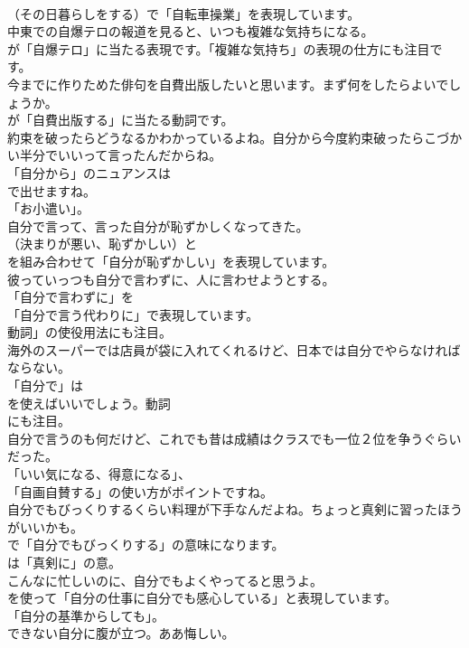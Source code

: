 \documentclass[8pt]{extreport}
\begin{document}
\begin{CJK}{UTF8}{min}
\\	（その日暮らしをする）で「自転車操業」を表現しています。	
\\	中東での自爆テロの報道を見ると、いつも複雑な気持ちになる。 
\\	が「自爆テロ」に当たる表現です。「複雑な気持ち」の表現の仕方にも注目です。	
\\	今までに作りためた俳句を自費出版したいと思います。まず何をしたらよいでしょうか。 
\\	が「自費出版する」に当たる動詞です。	
\\	約束を破ったらどうなるかわかっているよね。自分から今度約束破ったらこづかい半分でいいって言ったんだからね。 
\\	「自分から」のニュアンスは
\\	で出せますね。
\\	「お小遣い」。	
\\	自分で言って、言った自分が恥ずかしくなってきた。 
\\	（決まりが悪い、恥ずかしい）と 
\\	を組み合わせて「自分が恥ずかしい」を表現しています。	
\\	彼っていっつも自分で言わずに、人に言わせようとする。 
\\	「自分で言わずに」を
\\	「自分で言う代わりに」で表現しています。
\\	動詞」の使役用法にも注目。	
\\	海外のスーパーでは店員が袋に入れてくれるけど、日本では自分でやらなければならない。 
\\	「自分で」は
\\	を使えばいいでしょう。動詞
\\	にも注目。	
\\	自分で言うのも何だけど、これでも昔は成績はクラスでも一位２位を争うぐらいだった。 
\\	「いい気になる、得意になる」、
\\	「自画自賛する」の使い方がポイントですね。	
\\	自分でもびっくりするくらい料理が下手なんだよね。ちょっと真剣に習ったほうがいいかも。 
\\	で「自分でもびっくりする」の意味になります。
\\	は「真剣に」の意。	
\\	こんなに忙しいのに、自分でもよくやってると思うよ。 
\\	を使って「自分の仕事に自分でも感心している」と表現しています。
\\	「自分の基準からしても」。	
\\	できない自分に腹が立つ。ああ悔しい。 

\end{CJK}
\end{document}
